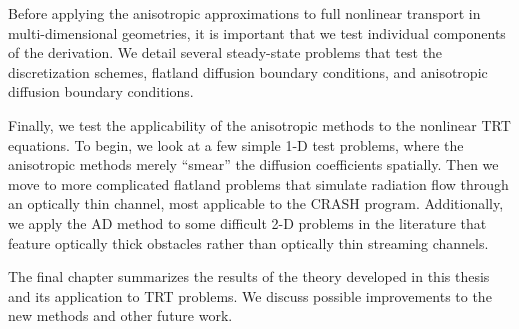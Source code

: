 Before applying the anisotropic approximations to full nonlinear transport in
multi-dimensional geometries, it is important that we test individual components
of the derivation. We detail several steady-state problems that test the
discretization schemes, flatland diffusion boundary conditions, and anisotropic
diffusion boundary conditions.

Finally, we test the applicability of the anisotropic methods to the nonlinear
TRT equations. To begin, we look at a few simple 1-D test problems, where the
anisotropic methods merely ``smear'' the diffusion coefficients spatially. Then
we move to more complicated flatland problems that simulate radiation flow
through an optically thin channel, most applicable to the CRASH program.
Additionally, we apply the AD method to some difficult 2-D problems in the
literature that feature optically thick obstacles rather than optically thin
streaming channels.

The final chapter summarizes the results of the theory developed in this thesis
and its application to TRT problems. We discuss possible improvements to the new
methods and other future work.

